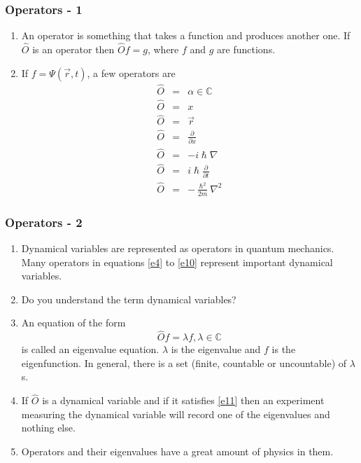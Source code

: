 \documentclass{beamer}
\begin{document}
\begin{frame}
\frametitle{Operators - 1}
\begin{enumerate}
\item An operator is something that takes a function and produces another one.
If $\hat{O}$ is an operator then $\hat{O}f = g$, where $f$ and $g$ are 
functions.
\item If $f = \Psi(\vec{r},t)$, a few operators are
\begin{eqnarray}
\hat{O} &=& \alpha \in \mathbb{C} \label{e4} \\
\hat{O} &=& x \label{e5} \\
\hat{O} &=& \vec{r} \label{e6} \\
\hat{O} &=& \frac{\partial}{\partial x} \label{e7} \\
\hat{O} &=& -i\hslash\nabla \label{e8} \\
\hat{O} &=& i\hslash\frac{\partial}{\partial t} \label{e9} \\
\hat{O} &=& -\frac{\hslash^2}{2m}\nabla^2 \label{e10}
\end{eqnarray}
\end{enumerate}
\end{frame}

\begin{frame}
\frametitle{Operators - 2}
\begin{enumerate}
\item Dynamical variables are represented as operators in quantum mechanics.
Many operators in equations \eqref{e4} to \eqref{e10} represent important 
dynamical variables.
\item Do you understand the term dynamical variables?
\item An equation of the form
\begin{equation}\label{e11}
\hat{O} f = \lambda f, \lambda \in \mathbb{C}
\end{equation}
is called an eigenvalue equation. $\lambda$ is the eigenvalue and $f$ is the
eigenfunction. In general, there is a set (finite, countable or uncountable) of
$\lambda$s.
\item If $\hat{O}$ is a dynamical variable and if it satisfies \eqref{e11} then
an experiment measuring the dynamical variable will record one of the 
eigenvalues and nothing else.
\item Operators and their eigenvalues have a great amount of physics in them.
\end{enumerate}
\end{frame}
\end{document}
